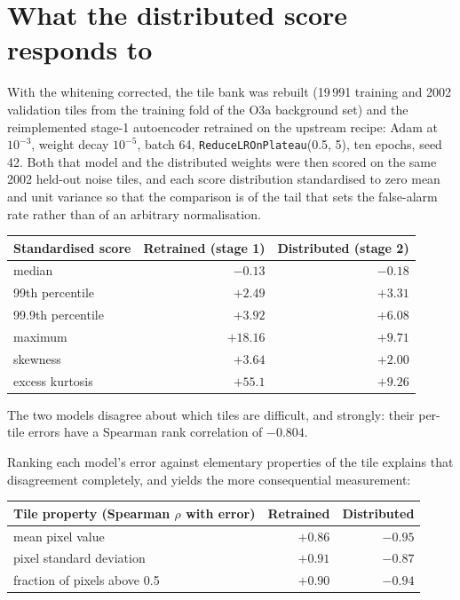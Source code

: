 \documentclass[11pt]{article}
\begin{document}
\section{What the distributed score responds to}
\label{sec:stage1}

With the whitening corrected, the tile bank was rebuilt (19\,991 training and 2002
validation tiles from the training fold of the O3a background set) and the
reimplemented stage-1 autoencoder retrained on the upstream recipe: Adam at $10^{-3}$,
weight decay $10^{-5}$, batch 64, \texttt{ReduceLROnPlateau}(0.5, 5), ten epochs,
seed 42. Both that model and the distributed weights were then scored on the same 2002
held-out noise tiles, and each score distribution standardised to zero mean and unit
variance so that the comparison is of the tail that sets the false-alarm rate rather
than of an arbitrary normalisation.

\begin{center}
\begin{tabular}{lrr}
\toprule
Standardised score & Retrained (stage 1) & Distributed (stage 2) \\
\midrule
median            & $-0.13$ & $-0.18$ \\
99th percentile   & $+2.49$ & $+3.31$ \\
99.9th percentile & $+3.92$ & $+6.08$ \\
maximum           & $+18.16$ & $+9.71$ \\
skewness          & $+3.64$ & $+2.00$ \\
excess kurtosis   & $+55.1$ & $+9.26$ \\
\bottomrule
\end{tabular}
\end{center}

The two models disagree about which tiles are difficult, and strongly: their per-tile
errors have a Spearman rank correlation of $-0.804$.

Ranking each model's error against elementary properties of the tile explains that
disagreement completely, and yields the more consequential measurement:

\begin{center}
\begin{tabular}{lrr}
\toprule
Tile property (Spearman $\rho$ with error) & Retrained & Distributed \\
\midrule
mean pixel value             & $+0.86$ & $-0.95$ \\
pixel standard deviation     & $+0.91$ & $-0.87$ \\
fraction of pixels above 0.5 & $+0.90$ & $-0.94$ \\
\bottomrule
\end{tabular}
\end{center}
\end{document}
